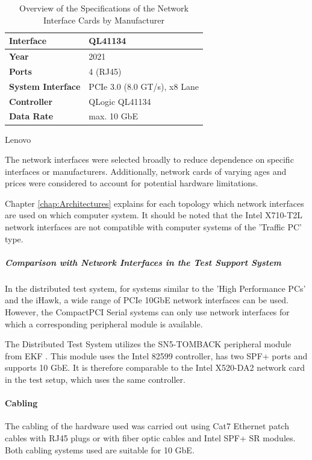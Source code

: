 \begin{table}[h!]
\begin{subtable}{\linewidth}
\centering
\begin{tabular}{C{2.2cm} C{4cm}}
	\toprule
	\textbf{Interface} & \textbf{QL41134}\\
	\toprule
	\textbf{Year} & 2021\\
	\midrule
	\textbf{Ports} & 4 (RJ45)\\
	\midrule
	\textbf{System Interface} & PCIe 3.0 (8.0 GT/s), x8 Lane\\
	\midrule
	\textbf{Controller} & QLogic QL41134\\
	\midrule
	\textbf{Data Rate} & max. 10 GbE\\
	\bottomrule
\end{tabular}
\caption{Lenovo}
\end{subtable}

\caption{Overview of the Specifications of the Network Interface Cards by Manufacturer}
\label{tab:NWHardware}
\end{table}

The network interfaces were selected broadly to reduce dependence on specific interfaces or manufacturers. Additionally, network cards of varying ages and prices were considered to account for potential hardware limitations.

Chapter \ref{chap:Architectures} explains for each topology which network interfaces are used on which computer system. It should be noted that the Intel X710-T2L network interfaces are not compatible with computer systems of the 'Traffic PC' type.


\subparagraph{Comparison with Network Interfaces in the Test Support System}

In the distributed test system, for systems similar to the 'High Performance PCs' and the iHawk, a wide range of PCIe 10GbE network interfaces can be used. However, the CompactPCI Serial systems can only use network interfaces for which a corresponding peripheral module is available.

The Distributed Test System utilizes the SN5-TOMBACK peripheral module from EKF \cite{setupnw05}. This module uses the Intel 82599 controller, has two SPF+ ports and supports 10 GbE. It is therefore comparable to the Intel X520-DA2 network card in the test setup, which uses the same controller.

\paragraph{Cabling}
The cabling of the hardware used was carried out using Cat7 Ethernet patch cables with RJ45 plugs or with fiber optic cables and Intel SPF+ SR modules. Both cabling systems used are suitable for 10 GbE.

